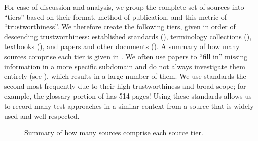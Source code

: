 For ease of discussion and analysis, we group the complete set of sources into
``tiers'' based on their format, method of publication, and this metric of
``trustworthiness''. We therefore create the following tiers, given in order of
descending trustworthiness: established standards (), terminology
collections (), textbooks (), and papers and other
documents (). A summary of how many sources comprise each tier is
given in . We often use papers to ``fill in'' missing
information in a more specific subdomain and do not always investigate them
entirely (see ), which results in a large number of them. We
use standards the second most frequently due to their high trustworthiness and
broad scope; for example, the glossary portion of \citep{IEEE2017} has 514
pages! Using these standards allows us to record many test approaches in a
similar context from a source that is widely used and well-respected.

\begin{figure}[bt!]
    \centering
    \caption{Summary of how many sources comprise each source tier.}
    \label{fig:sourceSummary}
\end{figure}

\ifnotpaper\newpage\fi

\subsubsection{}
\label{stds}

